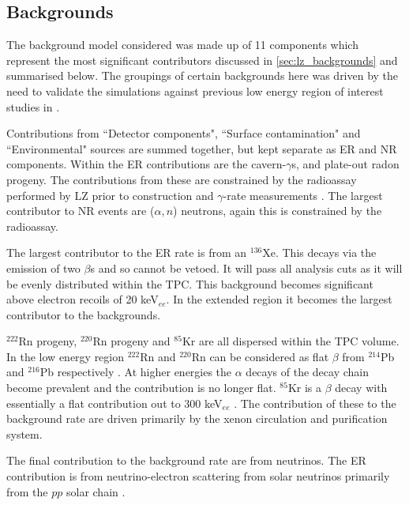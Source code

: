 \subsection{Backgrounds}
\par
The background model considered was made up of 11 components which represent the most significant contributors discussed in \autoref{sec:lz_backgrounds} and summarised below.
The groupings of certain backgrounds here was driven by the need to validate the simulations against previous low energy region of interest studies in \cite{LZ_projected_sensitivity_paper_ref,LZ_Ibles_LZStats_Thesis_ref}.

\par
Contributions from ``Detector components", ``Surface contamination" and ``Environmental" sources are summed together, but kept separate as ER and NR components.
Within the ER contributions are the cavern-$\gamma$s, and plate-out radon progeny.
The contributions from these are constrained by the radioassay performed by LZ prior to construction \cite{LZ_assay_ref} and $\gamma$-rate measurements \cite{LZ_Gamma_Ray_Background_ref}.
The largest contributor to NR events are ($\alpha,n$) neutrons, again this is constrained by the radioassay.
\par
The largest contributor to the ER rate is from an $^{136}$Xe.
This decays via the emission of two $\beta$s \cite{xenon136_ref} and so cannot be vetoed.
It will pass all analysis cuts as it will be evenly distributed within the TPC.
This background becomes significant above electron recoils of 20 keV$_{ee}$.
In the extended region it becomes the largest contributor to the backgrounds.
\par
${}^{222}$Rn progeny, ${}^{220}$Rn progeny and ${}^{85}$Kr are all dispersed within the TPC volume.
In the low energy region ${}^{222}$Rn and ${}^{220}$Rn can be considered as flat $\beta$ from $^{214}$Pb and $^{216}$Pb respectively \cite{LZ_projected_sensitivity_paper_ref}.
At higher energies the $\alpha$ decays of the decay chain become prevalent and the contribution is no longer flat.
${}^{85}$Kr is a $\beta$ decay with essentially a flat contribution out to 300 keV$_{ee}$ \cite{kr85_rate_ref}.
The contribution of these to the background rate are driven primarily by the xenon circulation and purification system. 
\par
The final contribution to the background rate are from neutrinos.
The ER contribution is from neutrino-electron scattering from solar neutrinos primarily from the $pp$ solar chain \cite{solar_neutrinos_ref}.
